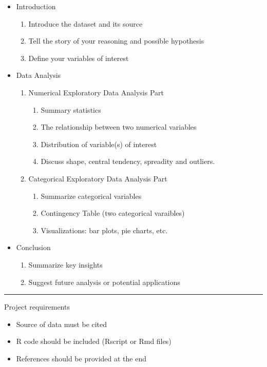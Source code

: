\documentclass[12pt]{article}
\begin{document}
\begin{itemize}
    \item Introduction
    \begin{enumerate}
        \item Introduce the dataset and its source
        \item Tell the story of your reasoning and possible hypothesis
        \item Define your variables of interest
    \end{enumerate}
    \item Data Analysis
    \begin{enumerate}
        \item Numerical Exploratory Data Analysis Part
        \begin{enumerate}
            \item Summary statistics 
            \item The relationship between two numerical variables 
            \item Distribution of variable(s) of interest
            \item Discuss shape, central tendency, spreadity and outliers. 
        \end{enumerate}
        \item Categorical Exploratory Data Analysis Part
        \begin{enumerate}
            \item Summarize categorical variables
            \item Contingency Table (two categorical varaibles)
            \item Visualizations: bar plots, pie charts, etc.
        \end{enumerate} 
    \end{enumerate}
    \item Conclusion
        \begin{enumerate}
            \item Summarize key insights
            \item Suggest future analysis or potential applications
        \end{enumerate} 
\end{itemize}
\begin{center}\rule{16cm}{1pt}\end{center}
Project requirements 
\begin{itemize}
    \item Source of data must be cited
    \item R code should be included (Rscript or Rmd files)
    \item References should be provided at the end
\end{itemize}
\end{document}
